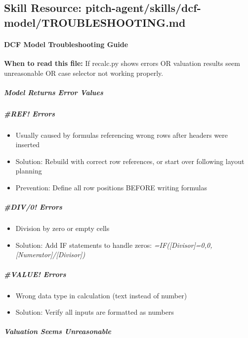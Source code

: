 \documentclass[11pt]{article}
\begin{document}
\subsection{Skill Resource: pitch-agent/skills/dcf-model/TROUBLESHOOTING.md}\label{file:pitch-agent-skills-dcf-model-TROUBLESHOOTING-md}

\paragraph{DCF Model Troubleshooting Guide}\mbox{}\par

\textbf{When to read this file:} If recalc.py shows errors OR valuation results seem unreasonable OR case selector not working properly.


\subparagraph{Model Returns Error Values}\mbox{}\par

\subparagraph{\#REF! Errors}\mbox{}\par
\begin{itemize}[leftmargin=*,itemsep=2pt,topsep=2pt]
\item {} Usually caused by formulas referencing wrong rows after headers were inserted
\item {} Solution: Rebuild with correct row references, or start over following layout planning
\item {} Prevention: Define all row positions BEFORE writing formulas
\end{itemize}

\subparagraph{\#DIV/0! Errors}\mbox{}\par
\begin{itemize}[leftmargin=*,itemsep=2pt,topsep=2pt]
\item {} Division by zero or empty cells
\item {} Solution: Add IF statements to handle zeros: \emph{=IF([Divisor]=0,0,[Numerator]/[Divisor])}
\end{itemize}

\subparagraph{\#VALUE! Errors}\mbox{}\par
\begin{itemize}[leftmargin=*,itemsep=2pt,topsep=2pt]
\item {} Wrong data type in calculation (text instead of number)
\item {} Solution: Verify all inputs are formatted as numbers
\end{itemize}

\subparagraph{Valuation Seems Unreasonable}\mbox{}\par
\end{document}
